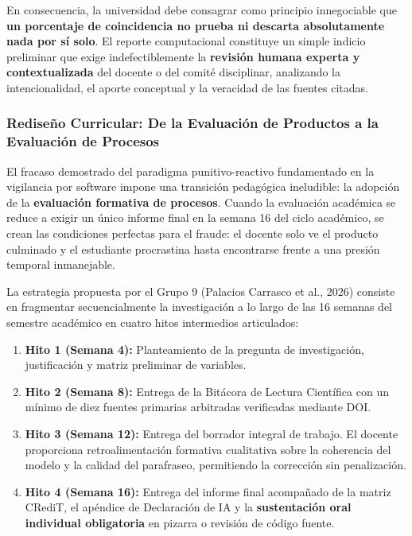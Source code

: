 En consecuencia, la universidad debe consagrar como principio innegociable que \textbf{un porcentaje de coincidencia no prueba ni descarta absolutamente nada por sí solo}. El reporte computacional constituye un simple indicio preliminar que exige indefectiblemente la \textbf{revisión humana experta y contextualizada} del docente o del comité disciplinar, analizando la intencionalidad, el aporte conceptual y la veracidad de las fuentes citadas.

\subsubsection{Rediseño Curricular: De la Evaluación de Productos a la Evaluación de Procesos}

El fracaso demostrado del paradigma punitivo-reactivo fundamentado en la vigilancia por software impone una transición pedagógica ineludible: la adopción de la \textbf{evaluación formativa de procesos}. Cuando la evaluación académica se reduce a exigir un único informe final en la semana 16 del ciclo académico, se crean las condiciones perfectas para el fraude: el docente solo ve el producto culminado y el estudiante procrastina hasta encontrarse frente a una presión temporal inmanejable.

La estrategia propuesta por el Grupo 9 (Palacios Carrasco et al., 2026) consiste en fragmentar secuencialmente la investigación a lo largo de las 16 semanas del semestre académico en cuatro hitos intermedios articulados:
\begin{enumerate}
    \item \textbf{Hito 1 (Semana 4):} Planteamiento de la pregunta de investigación, justificación y matriz preliminar de variables.
    \item \textbf{Hito 2 (Semana 8):} Entrega de la Bitácora de Lectura Científica con un mínimo de diez fuentes primarias arbitradas verificadas mediante DOI.
    \item \textbf{Hito 3 (Semana 12):} Entrega del borrador integral de trabajo. El docente proporciona retroalimentación formativa cualitativa sobre la coherencia del modelo y la calidad del parafraseo, permitiendo la corrección sin penalización.
    \item \textbf{Hito 4 (Semana 16):} Entrega del informe final acompañado de la matriz CRediT, el apéndice de Declaración de IA y la \textbf{sustentación oral individual obligatoria} en pizarra o revisión de código fuente.
\end{enumerate}

